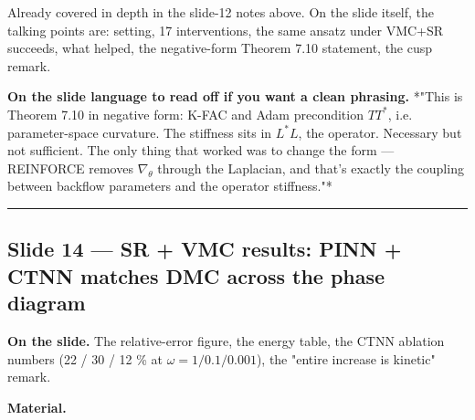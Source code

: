 \documentclass[11pt]{article}
\begin{document}
Already covered in depth in the slide-12 notes above. On the slide
itself, the talking points are: setting, 17 interventions, the same
ansatz under VMC+SR succeeds, what helped, the negative-form Theorem 7.10
statement, the cusp remark.

\textbf{On the slide language to read off if you want a clean phrasing.}
*"This is Theorem 7.10 in negative form: K-FAC and Adam precondition $TT^*$,
i.e. parameter-space curvature. The stiffness sits in $L^*L$, the
operator. Necessary but not sufficient. The only thing that worked was to
change the form --- REINFORCE removes $\nabla_\theta$ through the Laplacian,
and that's exactly the coupling between backflow parameters and the
operator stiffness."*

\vspace{4pt}\hrule\vspace{8pt}

\subsection*{Slide 14 --- SR + VMC results: PINN + CTNN matches DMC across the phase diagram}

\textbf{On the slide.} The relative-error figure, the energy table, the CTNN
ablation numbers (22 / 30 / 12 \% at $\omega = 1 / 0.1 / 0.001$), the
"entire increase is kinetic" remark.

\textbf{Material.}
\end{document}

